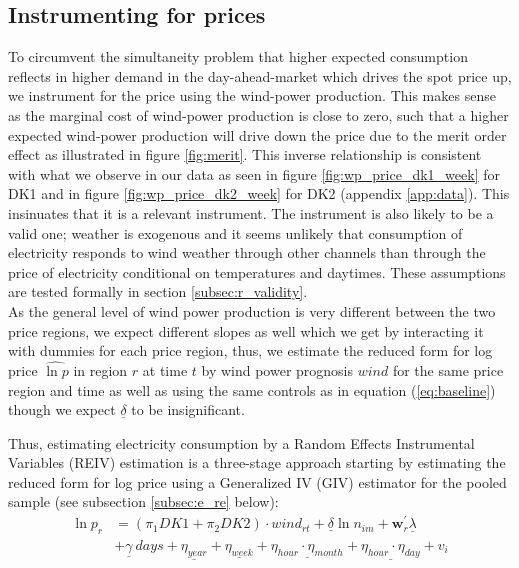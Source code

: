 \subsection{Instrumenting for prices}
\label{subsec:e_instrumenting}
To circumvent the simultaneity problem that higher expected consumption reflects in higher demand in the day-ahead-market which drives the spot price up, we instrument for the price using the wind-power production. This makes sense as the marginal cost of wind-power production is close to zero, such that a higher expected wind-power production will drive down the price due to the merit order effect as illustrated in figure \ref{fig:merit}. This inverse relationship is consistent with what we observe in our data as seen in figure \ref{fig:wp_price_dk1_week} for DK1 and in figure \ref{fig:wp_price_dk2_week} for DK2 (appendix \ref{app:data}). This insinuates that it is a relevant instrument. The instrument is also likely to be a valid one; weather is exogenous and it seems unlikely that consumption of electricity responds to wind weather through other channels than through the price of electricity conditional on temperatures and daytimes. These assumptions are tested formally in section \ref{subsec:r_validity}.
\medskip\\
As the general level of wind power production is very different between the two price regions, we expect different slopes as well which we get by interacting it with dummies for each price region, thus, we estimate the reduced form for log price $\widehat{\ln p}$ in region $r$ at time $t$ by wind power prognosis $wind$ for the same price region and time as well as using the same controls as in equation (\ref{eq:baseline}) though we expect $\underline{\delta}$ to be insignificant.
\par
Thus, estimating electricity consumption by a Random Effects Instrumental Variables (REIV) estimation is a three-stage approach starting by estimating the reduced form for log price using a Generalized IV (GIV) estimator for the pooled sample (see subsection \ref{subsec:e_re} below):
\begin{equation}
  \label{eq:reduced}
  \begin{split}
    \ln p_{r} &= (\pi_1 DK1+\pi_2 DK2)\cdot wind_{rt} +\underline{\delta}\ln n_{im}+\bm{w}^{'}_{r}\underline{\lambda}\\
  &+\underline{\gamma}\ days+\underline{\eta_{year}}+\underline{\eta_{week}}+\underline{\eta_{hour}\cdot\eta_{month}}+\underline{\eta_{hour}\cdot\eta_{day}}+v_{i}
  \end{split}
\end{equation}

